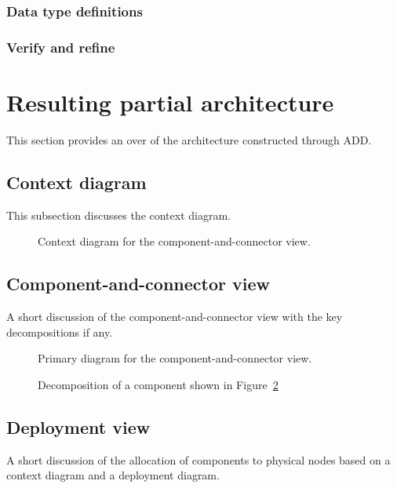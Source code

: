 \documentclass[a4paper,10pt]{article}
\begin{document}
\subsubsection{Data type definitions}
\subsubsection{Verify and refine}

\section{Resulting partial architecture}\label{sec:architecture}
This section provides an over of the architecture constructed through ADD\@.

\subsection{Context diagram}
This subsection discusses the context diagram.

\begin{figure}[!htp]
    \centering
    \caption{Context diagram for the component-and-connector view.
        }\label{fig:cc_context}
\end{figure}

\subsection{Component-and-connector view}
A short discussion of the component-and-connector view with the key
decompositions if any.

\begin{figure}[!htp]
    \centering
    \caption{Primary diagram for the component-and-connector view.
        }\label{fig:cc_main}
\end{figure}

\begin{figure}[!htp]
    \centering
    \caption{Decomposition of a component shown in Figure~\ref{fig:cc_main}
        }\label{fig:decomp_decomp1}
\end{figure}

\subsection{Deployment view}
A short discussion of the allocation of components to physical nodes based on a
context diagram and a deployment diagram.
\end{document}

